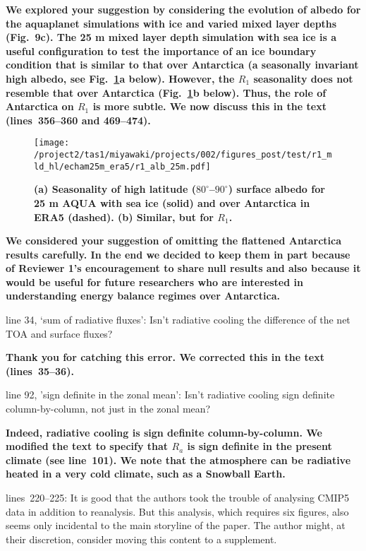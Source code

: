 \documentclass{article}
\begin{document}
\textbf{We explored your suggestion by considering the evolution of albedo for the aquaplanet simulations with ice and varied mixed layer depths (Fig.~9c). The 25 m mixed layer depth simulation with sea ice is a useful configuration to test the importance of an ice boundary condition that is similar to that over Antarctica (a seasonally invariant high albedo, see Fig.~\ref{fig:echam-alb-ice}a below). However, the $R_1$ seasonality does not resemble that over Antarctica (Fig.~\ref{fig:echam-alb-ice}b below). Thus, the role of Antarctica on $R_1$ is more subtle. We now discuss this in the text (lines~356--360 and 469--474).}

\begin{figure}[!h]
    \centering
    \noindent\texttt{[image: /project2/tas1/miyawaki/projects/002/figures\_post/test/r1\_mld\_hl/echam25m\_era5/r1\_alb\_25m.pdf]}
    \caption{\bf (a) Seasonality of high latitude ($80^\circ$--$90^\circ$) surface albedo for 25 m AQUA with sea ice (solid) and over Antarctica in ERA5 (dashed). (b) Similar, but for $R_1$.}
    \label{fig:echam-alb-ice}
\end{figure}

\textbf{We considered your suggestion of omitting the flattened Antarctica results carefully. In the end we decided to keep them in part because of Reviewer 1's encouragement to share null results and also because it would be useful for future researchers who are interested in understanding energy balance regimes over Antarctica.}

line 34, `sum of radiative fluxes': Isn't radiative cooling the difference of the net TOA and surface fluxes?

\textbf{Thank you for catching this error. We corrected this in the text (lines~35--36).}

line 92, 'sign definite in the zonal mean': Isn't radiative cooling sign definite column-by-column, not just in the zonal mean?

\textbf{Indeed, radiative cooling is sign definite column-by-column. We modified the text to specify that $R_a$ is sign definite in the present climate (see line~101). We note that the atmosphere can be radiative heated in a very cold climate, such as a Snowball Earth.}

lines~220--225: It is good that the authors took the trouble of analysing CMIP5 data in addition to reanalysis. But this analysis, which requires six figures, also seems only incidental to the main storyline of the paper. The author might, at their discretion, consider moving this content to a supplement.
\end{document}
